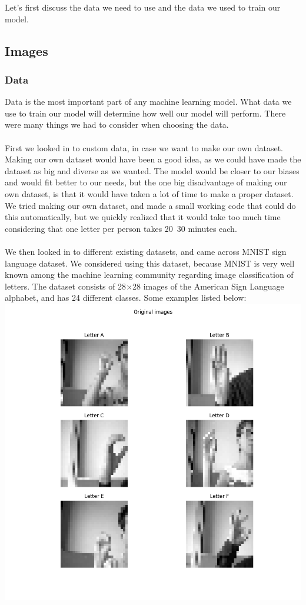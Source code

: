 \documentclass[../paper.tex]{subfiles}
\begin{document}
    Let's first discuss the data we need to use and the data we used to train our model.
    
    \subsection{Images}
    \subsubsection{Data}
    Data is the most important part of any machine learning model.
    What data we use to train our model will determine how well our model will perform. 
    There were many things we had to consider when choosing the data.\\
    \\
    First we looked in to custom data, in case we want to make our own dataset. 
    Making our own dataset would have been a good idea, 
    as we could have made the dataset as big and diverse as we wanted.
    The model would be closer to our biases and would fit better to our needs, 
    but the one big disadvantage of making our own dataset, is that it would have taken a lot of time to make a proper dataset.\\
    We tried making our own dataset, and made a small working code that could do this automatically, 
    but we quickly realized that it would take too much time considering that one letter per person takes 20~30 minutes each.\\
    \\
    We then looked in to different existing datasets, and came across MNIST sign language dataset\cite{d0}. 
    We considered using this dataset, because MNIST is very well known among the machine learning community regarding image classification of letters\cite{o0}.
    The dataset consists of 28$\times$28 images of the American Sign Language alphabet, 
    and has 24 different classes. 
    Some examples listed below:
    \includegraphics[width=\linewidth]{letters_grid_6}
\end{document}
